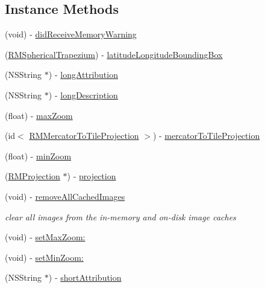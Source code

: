 \subsection*{Instance Methods}
\begin{DoxyCompactItemize}
\item 
(void) -\/ \hyperlink{protocol_r_m_tile_source-p_a70eade96883de23124c3f86321685b52}{did\-Receive\-Memory\-Warning}
\item 
(\hyperlink{struct_r_m_spherical_trapezium}{R\-M\-Spherical\-Trapezium}) -\/ \hyperlink{protocol_r_m_tile_source-p_a740893daebd1fe8e0a463e64a28816dd}{latitude\-Longitude\-Bounding\-Box}
\item 
(N\-S\-String $\ast$) -\/ \hyperlink{protocol_r_m_tile_source-p_adff372c4c777906e56b90a61895d2ff4}{long\-Attribution}
\item 
(N\-S\-String $\ast$) -\/ \hyperlink{protocol_r_m_tile_source-p_a1f9b03c3dac588a98b050afe3a71dcfa}{long\-Description}
\item 
(float) -\/ \hyperlink{protocol_r_m_tile_source-p_a7d1ecfedd45c8ac433f972f38e7ac9a4}{max\-Zoom}
\item 
(id$<$ \hyperlink{protocol_r_m_mercator_to_tile_projection-p}{R\-M\-Mercator\-To\-Tile\-Projection} $>$) -\/ \hyperlink{protocol_r_m_tile_source-p_a5086edf762a1756058c665c3a9b0d26f}{mercator\-To\-Tile\-Projection}
\item 
(float) -\/ \hyperlink{protocol_r_m_tile_source-p_a7cd043d2bc55eded244b4c5da41dd909}{min\-Zoom}
\item 
(\hyperlink{interface_r_m_projection}{R\-M\-Projection} $\ast$) -\/ \hyperlink{protocol_r_m_tile_source-p_a75c20205e72db39aa01943d8b6d8fc29}{projection}
\item 
(void) -\/ \hyperlink{protocol_r_m_tile_source-p_aa5c4555fb2500e5826d5558985d4ee3c}{remove\-All\-Cached\-Images}
\begin{DoxyCompactList}\small\item\em clear all images from the in-\/memory and on-\/disk image caches \end{DoxyCompactList}\item 
(void) -\/ \hyperlink{protocol_r_m_tile_source-p_afd2310f2b3b95e91de2ef530ee5d5122}{set\-Max\-Zoom\-:}
\item 
(void) -\/ \hyperlink{protocol_r_m_tile_source-p_ad8b2d3ab319784223970f215f6dd2f16}{set\-Min\-Zoom\-:}
\item 
(N\-S\-String $\ast$) -\/ \hyperlink{protocol_r_m_tile_source-p_afd67cfacb812cd3216ef1309297e264d}{short\-Attribution}

\end{DoxyCompactItemize}
